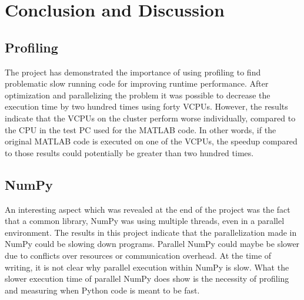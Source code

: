 \documentclass[12pt, a4paper]{article}
\begin{document}

\section{Conclusion and Discussion}

\subsection{Profiling}

The project has demonstrated the importance of using profiling to find problematic slow running code for improving runtime performance.
After optimization and parallelizing the problem it was possible to decrease the execution time by two hundred times using forty VCPUs.
However, the results indicate that the VCPUs on the cluster perform worse individually, compared to the CPU in the test PC used for the MATLAB code.
In other words, if the original MATLAB code is executed on one of the VCPUs, the speedup compared to those results could potentially be greater than two hundred times.

\subsection{NumPy}

An interesting aspect which was revealed at the end of the project was the fact that a common library, NumPy was using multiple threads, even in a parallel environment.
The results in this project indicate that the parallelization made in NumPy could be slowing down programs.
Parallel NumPy could maybe be slower due to conflicts over resources or communication overhead.
At the time of writing, it is not clear why parallel execution within NumPy is slow.
What the slower execution time of parallel NumPy does show is the necessity of profiling and measuring when Python code is meant to be fast.
\end{document}

